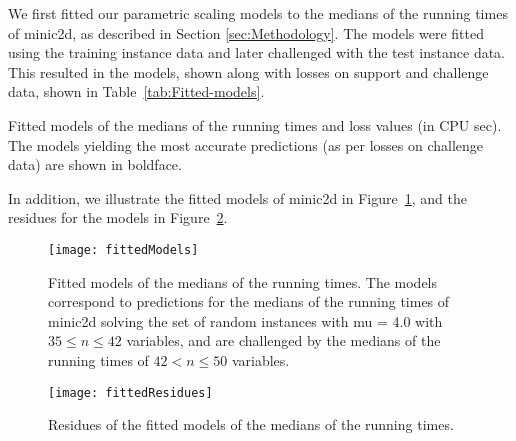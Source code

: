 We first fitted our parametric scaling models to the
medians of the
 running times
of minic2d, as described in Section \ref{sec:Methodology}. The
models were fitted using the training instance data and later
challenged with the test instance data.
This resulted in the models, shown along with losses on support and
challenge data, shown in Table~\ref{tab:Fitted-models}.
\begin{table}[tb]
\begin{centering}

% 
\par\end{centering}

\caption{\label{tab:Fitted-models}Fitted models of the medians
of the  running
times and loss
values (in CPU sec). The models yielding the most
accurate predictions (as per losses on challenge data) are shown in
boldface.}
\end{table}
In addition, we illustrate the fitted models of minic2d in
Figure~\ref{fig:Fitted-models},
and the residues for the models in Figure~\ref{fig:Fitted-residues}.
\begin{figure}[tb]
\noindent \begin{centering}
\texttt{[image: fittedModels]}
\par\end{centering}

\caption{\label{fig:Fitted-models} Fitted models of the medians of the
 running times.
The models correspond to predictions for the medians of the
 running times of
minic2d solving the set of random instances with mu = 4.0
with $35\leq n\leq 42$ variables, and are challenged by the medians of
the 
running times of $42< n \leq 50$ variables.}
\end{figure}


\begin{figure}[tb]
\noindent \begin{centering}
\texttt{[image: fittedResidues]}
\par\end{centering}

\caption{\label{fig:Fitted-residues} Residues of the fitted models of the
medians of the 
running times. }
\end{figure}


